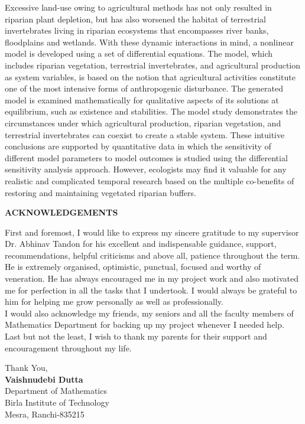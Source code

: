 \documentclass[12pt,a4wide]{report}
\numberwithin{equation}{chapter}
\numberwithin{theorem}{chapter}
\begin{document}
\noindent Excessive land-use owing to agricultural methods has not only resulted in riparian plant depletion, but has also worsened the habitat of terrestrial invertebrates living in riparian ecosystems that encompasses river banks, floodplains and wetlands. With these dynamic interactions in mind, a nonlinear model is developed using a set of differential equations. The model, which includes riparian vegetation, terrestrial invertebrates, and agricultural production as system variables, is based on the notion that agricultural activities constitute one of the most intensive forms of anthropogenic disturbance. The generated model is examined mathematically for qualitative aspects of its solutions at equilibrium, such as existence and stabilities. The model study demonstrates the circumstances under which agricultural production, riparian vegetation, and terrestrial invertebrates can coexist to create a stable system. These intuitive conclusions are supported by quantitative data in which the sensitivity of different model parameters to model outcomes is studied using the differential sensitivity analysis approach. However, ecologists may find it valuable for any realistic and complicated temporal research based on the multiple co-benefits of restoring and maintaining vegetated riparian buffers.
\clearpage

\begin{center}
	{\Large{\bf{ACKNOWLEDGEMENTS}}}
\end{center}

\noindent 
First and foremost, I would like to express my sincere gratitude to my supervisor Dr. Abhinav Tandon for his excellent and indispensable guidance, support, recommendations, helpful criticisms and above all, patience throughout the term. He is extremely organised, optimistic, punctual, focused and worthy of veneration. He has always encouraged me in my project work and also motivated me for perfection in all the tasks that I undertook. I would always be grateful to him for helping me grow personally as well as professionally.\\
I would also acknowledge my friends, my seniors and all the faculty members of Mathematics Department for backing up my project whenever I needed help.
Last but not the least, I wish to thank my parents for their support and encouragement throughout my life.\\
\begin{flushright}
	\vspace*{-.5cm}
	Thank You,\\
	\textbf{	Vaishnudebi Dutta}\\
	Department of Mathematics\\
	Birla Institute of Technology\\
	Mesra, Ranchi-835215\\
\end{flushright}
\end{document}
